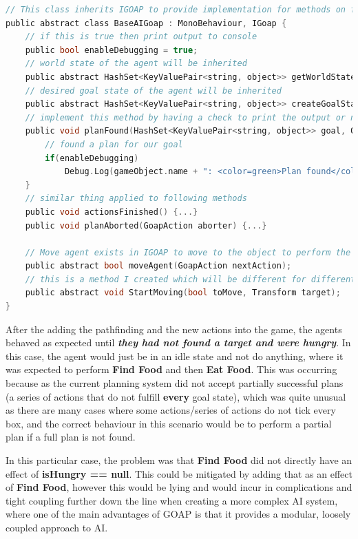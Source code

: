 \documentclass[11pt]{report}
\begin{document}
\begin{lstlisting}[language=c]
// This class inherits IGOAP to provide implementation for methods on finishing the plans.
public abstract class BaseAIGoap : MonoBehaviour, IGoap {
    // if this is true then print output to console
    public bool enableDebugging = true;
    // world state of the agent will be inherited
    public abstract HashSet<KeyValuePair<string, object>> getWorldState(); 
    // desired goal state of the agent will be inherited
    public abstract HashSet<KeyValuePair<string, object>> createGoalState();
    // implement this method by having a check to print the output or not
    public void planFound(HashSet<KeyValuePair<string, object>> goal, Queue<GoapAction> actions) {
        // found a plan for our goal
        if(enableDebugging)
            Debug.Log(gameObject.name + ": <color=green>Plan found</color> " + GoapAgent.prettyPrint(actions));
    }
    // similar thing applied to following methods
    public void actionsFinished() {...}
    public void planAborted(GoapAction aborter) {...}

    // Move agent exists in IGOAP to move to the object to perform the action
    public abstract bool moveAgent(GoapAction nextAction);
    // this is a method I created which will be different for different agents, it performs all the things to start and stop moving the agent.
    public abstract void StartMoving(bool toMove, Transform target);
}
\end{lstlisting}


After the adding the pathfinding and the new actions into the game, the agents behaved as expected until \textit{\textbf{they had not found a target and were hungry}}. In this case, the agent would just be in an idle state and not do anything, where it was expected to perform \textbf{Find Food} and then \textbf{Eat Food}. This was occurring because as the current planning system did not accept partially successful plans (a series of actions that do not fulfill \textbf{every} goal state), which was quite unusual as there are many cases where some actions/series of actions do not tick every box, and the correct behaviour in this scenario would be to perform a partial plan if a full plan is not found.

In this particular case, the problem was that \textbf{Find Food} did not directly have an effect of \textbf{isHungry == null}. This could be mitigated by adding that as an effect of \textbf{Find Food}, however this would be lying and would incur in complications and tight coupling further down the line when creating a more complex AI system, where one of the main advantages of GOAP is that it provides a modular, loosely coupled approach to AI.
\end{document}
